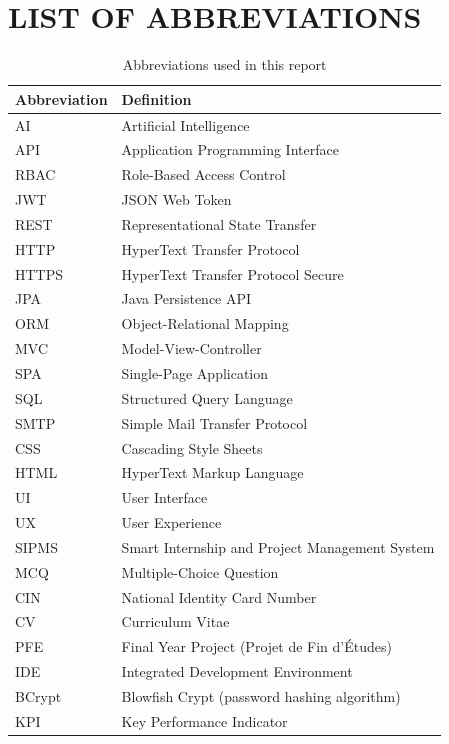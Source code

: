 \chapter*{LIST OF ABBREVIATIONS}
\thispagestyle{MyStyle}

\begin{table}[H]
\centering
\begin{tabular}{|p{3.5cm}|p{9.5cm}|}
\hline
\rowcolor{gray!20}
\textbf{Abbreviation} & \textbf{Definition} \\
\hline
AI & Artificial Intelligence \\
\hline
API & Application Programming Interface \\
\hline
RBAC & Role-Based Access Control \\
\hline
JWT & JSON Web Token \\
\hline
REST & Representational State Transfer \\
\hline
HTTP & HyperText Transfer Protocol \\
\hline
HTTPS & HyperText Transfer Protocol Secure \\
\hline
JPA & Java Persistence API \\
\hline
ORM & Object-Relational Mapping \\
\hline
MVC & Model-View-Controller \\
\hline
SPA & Single-Page Application \\
\hline
SQL & Structured Query Language \\
\hline
SMTP & Simple Mail Transfer Protocol \\
\hline
CSS & Cascading Style Sheets \\
\hline
HTML & HyperText Markup Language \\
\hline
UI & User Interface \\
\hline
UX & User Experience \\
\hline
SIPMS & Smart Internship and Project Management System \\
\hline
MCQ & Multiple-Choice Question \\
\hline
CIN & National Identity Card Number \\
\hline
CV & Curriculum Vitae \\
\hline
PFE & Final Year Project (Projet de Fin d'Études) \\
\hline
IDE & Integrated Development Environment \\
\hline
BCrypt & Blowfish Crypt (password hashing algorithm) \\
\hline
KPI & Key Performance Indicator \\
\hline
\end{tabular}
\caption*{Abbreviations used in this report}
\end{table}
